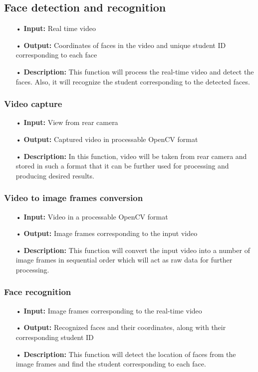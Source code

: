 \documentclass{scrreprt}
\begin{document}
\subsection{Face detection and recognition}
\begin{enumerate}
\item[•] \textbf{Input:} Real time video
\item[•] \textbf{Output:} Coordinates of faces in the video and unique student ID
corresponding to each face
\item[•] \textbf{Description:} This function will process the real-time video and detect the faces.
Also, it will recognize the student corresponding to the detected faces.
\end{enumerate}

\subsubsection{Video capture}
\begin{enumerate}
\item[•] \textbf{Input:} View from rear camera
\item[•] \textbf{Output:} Captured video in processable OpenCV format
\item[•] \textbf{Description:} In this function, video will be taken from rear camera and stored
in such a format that it can be further used for processing and producing desired results.
\end{enumerate}

\subsubsection{Video to image frames conversion}
\begin{enumerate}
\item[•] \textbf{Input:} Video in a processable OpenCV format
\item[•] \textbf{Output:} Image frames corresponding to the input video
\item[•] \textbf{Description:} This function will convert the input video into a number
of image frames in sequential order which will act as raw data for further processing.
\end{enumerate}

\subsubsection{Face recognition}
\begin{enumerate}
\item[•] \textbf{Input:} Image frames corresponding to the real-time video
\item[•] \textbf{Output:} Recognized faces and their coordinates, along with their corresponding student ID
\item[•] \textbf{Description:} This function will detect the location of faces from the image frames and find the student corresponding to each face.
\end{enumerate}
\end{document}

